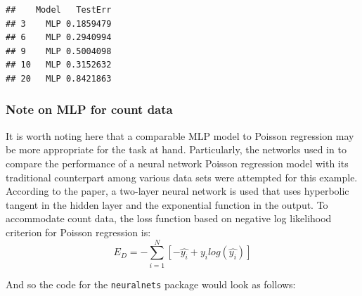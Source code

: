 \begin{Shaded}
\begin{Highlighting}[]
\OtherTok{\textless{}{-}} \SpecialCharTok{$}\SpecialCharTok{{-}}\SpecialCharTok{\^{}}\NormalTok{) }
\NormalTok{  \}}

\OtherTok{\textless{}{-}} 

\NormalTok{\}}


\OtherTok{\textless{}{-}} \NormalTok{(}\NormalTok{(} \NormalTok{, }
\end{Highlighting}
\end{Shaded}

\begin{verbatim}
##    Model   TestErr
## 3    MLP 0.1859479
## 6    MLP 0.2940994
## 9    MLP 0.5004098
## 10   MLP 0.3152632
## 20   MLP 0.8421863
\end{verbatim}

\hypertarget{note-on-mlp-for-count-data}{%
\subsubsection{Note on MLP for count
data}\label{note-on-mlp-for-count-data}}

It is worth noting here that a comparable MLP model to Poisson
regression may be more appropriate for the task at hand. Particularly,
the networks used in \cite{fallah2009nonlinear} to compare the
performance of a neural network Poisson regression model with its
traditional counterpart among various data sets were attempted for this
example. According to the paper, a two-layer neural network is used that
uses hyperbolic tangent in the hidden layer and the exponential function
in the output. To accommodate count data, the loss function based on
negative log likelihood criterion for Poisson regression is: \[
E_D = - \sum_{i=1}^N \left[ -\hat{y_i} + y_i log(\hat{y_i}) \right]
\]

And so the code for the \texttt{neuralnets} package would look as
follows:

